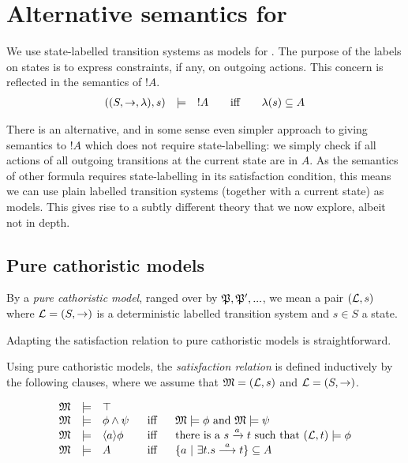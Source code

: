 \section{Alternative semantics for \cathoristic{}}\label{pureModels}

\NI We use state-labelled transition systems as models for
\cathoristic{}. The purpose of the labels on states is to express
constraints, if any, on outgoing actions. This concern is reflected in
the semantics of $!A$.
\[
\begin{array}{lclcl}
  ((S, \rightarrow, \lambda), s) & \models & !A  &\mbox{\quad iff\quad } & \lambda(s) \subseteq A
\end{array}
\]

\NI There is an alternative, and in some sense even simpler approach
to giving semantics to $!A$ which does not require state-labelling: we
simply check if all actions of all outgoing transitions at the current
state are in $A$.  As the semantics of other formula requires state-labelling in its satisfaction condition, this means we can use plain
labelled transition systems (together with a current state) as
models. This gives rise to a subtly different theory that we now
explore, albeit not in depth.

\subsection{Pure cathoristic models}

\begin{definition}\label{pureModelsDef}
By a \emph{pure cathoristic model}, ranged over by $\frak{P}, \frak{P}', ...$,
we mean a pair $(\mathcal{L}, s)$ where $\mathcal{L} = (S, \rightarrow)$ is a
deterministic labelled transition system and $s \in S$ a state.
\end{definition}

\NI Adapting the satisfaction relation to pure cathoristic models is
straightforward.

\begin{definition}
Using pure cathoristic models, the  \emph{satisfaction relation} is defined 
inductively by the following clauses, where we assume that $\frak{M} =
(\mathcal{L}, s)$ and $\mathcal{L} = (S, \rightarrow)$.

\[
\begin{array}{lclcl}
  \frak{M} & \models & \top   \\
  \frak{M} & \models & \phi \land \psi &\ \mbox{ iff } \ & \frak{M}  \models \phi \mbox { and } \frak{M} \models \psi  \\
  \frak{M} & \models & \langle a \rangle \phi & \mbox{ iff } & \text{there is a } s \xrightarrow{a} t \mbox { such that } (\mathcal{L}, t) \models \phi  \\
  \frak{M} & \models & A &\mbox{ iff } & \{a\ |\ \exists t.s \stackrel{a}{\longrightarrow} t \} \subseteq A
\end{array}
\]
\end{definition}

